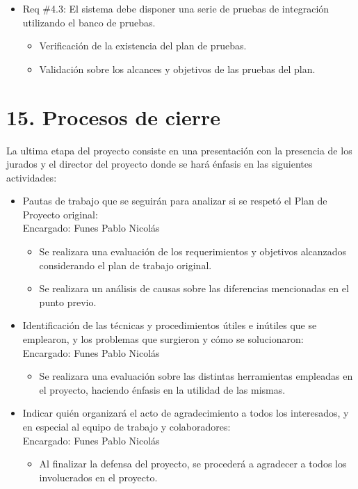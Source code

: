 \documentclass[
11pt, %
]{charter}
\begin{document}
\begin{itemize}
\item Req \#4.3: El sistema debe disponer una serie de pruebas de integración utilizando el banco de pruebas.
\begin{itemize}
	\item  Verificación de la existencia del plan de pruebas.
	\item Validación sobre los alcances y objetivos de las pruebas del plan.
\end{itemize}

\end{itemize}



\section{15. Procesos de cierre}    
\label{sec:cierre}

La ultima etapa del proyecto consiste en una presentación con la presencia de los jurados y el director del proyecto donde se hará énfasis en las siguientes actividades:

\begin{itemize}
	\item Pautas de trabajo que se seguirán para analizar si se respetó el Plan de Proyecto original:\\
	Encargado: Funes Pablo Nicolás\\
	\begin{itemize}
	 \item Se realizara una evaluación de los requerimientos y objetivos alcanzados considerando el plan de trabajo original.
	 \item Se realizara un análisis de causas sobre las diferencias mencionadas en el punto previo.
	 \end{itemize}
	\item Identificación de las técnicas y procedimientos útiles e inútiles que se emplearon, y los problemas que surgieron y cómo se solucionaron:
\\
	Encargado: Funes Pablo Nicolás\\
		\begin{itemize}
	\item Se realizara una evaluación sobre las distintas herramientas empleadas en el proyecto, haciendo énfasis en la utilidad de las mismas.
		\end{itemize}

	\item Indicar quién organizará el acto de agradecimiento a todos los interesados, y en especial al equipo de trabajo y colaboradores:
	\\
	Encargado: Funes Pablo Nicolás\\
		\begin{itemize}
	\item Al finalizar la defensa del proyecto, se procederá a agradecer a todos los involucrados en el proyecto.
	  	\end{itemize}
\end{itemize}
\end{document}
